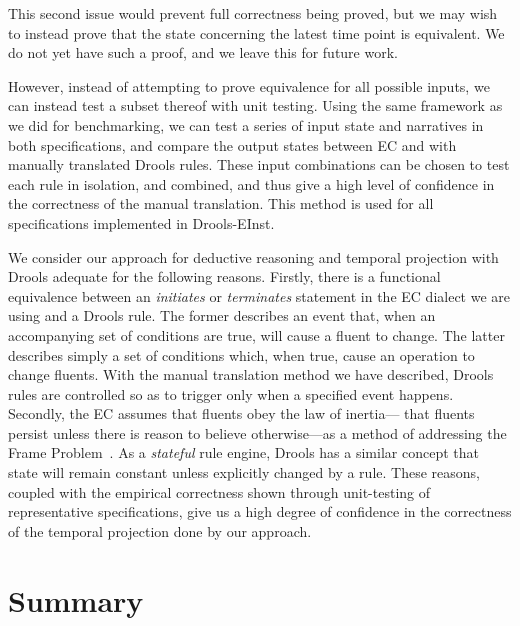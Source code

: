
This second issue would prevent full correctness being proved, but we may wish
to instead prove that the state concerning the latest time point is
equivalent. We do not yet have such a proof, and we leave this for future work.

However, instead of attempting to prove equivalence for all possible inputs,
we can instead test a subset thereof with unit testing. Using the same
framework as we did for benchmarking, we can test a series of input state and
narratives in both specifications, and compare the output states between
\ac{EC} and with manually translated Drools rules. These input combinations can be
chosen to test each rule in isolation, and combined, and thus give a high
level of confidence in the correctness of the manual translation. This method is used
for all specifications implemented in Drools-EInst.

We consider our approach for deductive reasoning and temporal projection
with Drools adequate for the following reasons. Firstly, there is a functional
equivalence between an \emph{initiates} or \emph{terminates} statement in the
\ac{EC} dialect we are using and a Drools rule. The former describes an event that, when an
accompanying set of conditions are true, will cause a fluent to change. The
latter describes simply a set of conditions which, when true, cause an
operation to change fluents. With the manual translation method we have described,
Drools rules are controlled so as to trigger only when a specified event
happens. Secondly, the \ac{EC} assumes that fluents obey the law of inertia---
that fluents persist unless there is reason to believe otherwise---as a method
of addressing the Frame Problem~\citep{Shanahan1999}. As a \emph{stateful}
rule engine, Drools has a similar concept that state will remain constant
unless explicitly changed by a rule. These reasons, coupled with the empirical
correctness shown through unit-testing of representative specifications, give
us a high degree of confidence in the correctness of the temporal projection done by our approach.

\section{Summary}

